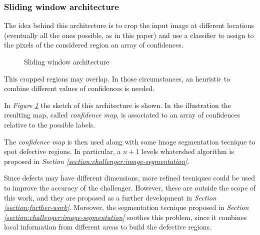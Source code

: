 \subsubsection{Sliding window architecture}
\par{
	The idea behind this architecture is to crop the input image at different locations (eventually all the ones possible, as in this paper) and use a classifier to assign to the pixels of the considered region an array of confidences.
}
\begin{figure}
	\centering
	\caption{Sliding window architecture}\label{fig:sliding-window}
\end{figure}
\par{
	This cropped regions may overlap. In those circumstances, an heuristic to combine different values of confidences is needed.
}
\par{
	In \emph{Figure \ref{fig:sliding-window}} the sketch of this architecture is shown. In the illustration the resulting map, called \emph{confidence map}, is associated to an array of confidences relative to the possible labels. 
}
\par{
	The \emph{confidence map} is then used along with some image segmentation tecnique to spot defective regions. In particular, a $n+1$ levels whatershed algorithm is proposed in \emph{Section \ref{section:challenger:image-segmentation}}.
}
\par{
	Since defects may have different dimensions, more refined tecniques could be used to improve the accuracy of the challenger. However, these are outside the scope of this work, and they are proposed as a further development in \emph{Section \ref{section:further-work}}. Moreover, the segmentation tecnique proposed in \emph{Section \ref{section:challenger:image-segmentation}} soothes this problem, since it combines local information from different areas to build the defective regions.
}
